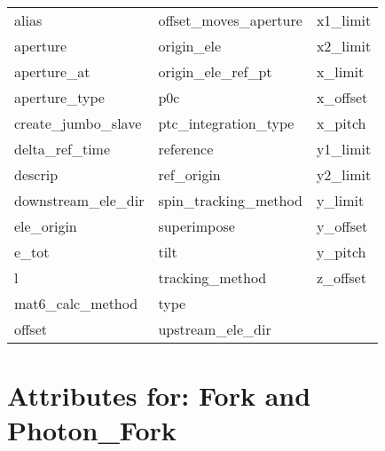  \begin{tabular}{lll} \toprule
alias                       & offset_moves_aperture       & x1_limit                    \\
aperture                    & origin_ele                  & x2_limit                    \\
aperture_at                 & origin_ele_ref_pt           & x_limit                     \\
aperture_type               & p0c                         & x_offset                    \\
create_jumbo_slave          & ptc_integration_type        & x_pitch                     \\
delta_ref_time              & reference                   & y1_limit                    \\
descrip                     & ref_origin                  & y2_limit                    \\
downstream_ele_dir          & spin_tracking_method        & y_limit                     \\
ele_origin                  & superimpose                 & y_offset                    \\
e_tot                       & tilt                        & y_pitch                     \\
l                           & tracking_method             & z_offset                    \\
mat6_calc_method            & type                        &                             \\
offset                      & upstream_ele_dir            &                             \\
 \bottomrule
 \end{tabular}
 \vfill
 
 \section{Attributes for: Fork and Photon_Fork}
 \label{s:list.fork}
 
